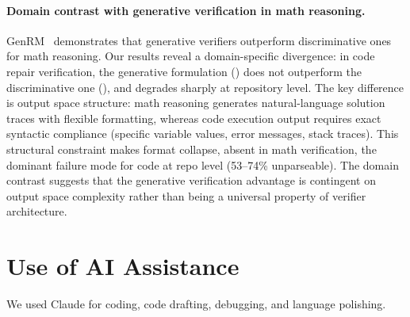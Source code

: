 \paragraph{Domain contrast with generative verification in math reasoning.}
GenRM~\cite{hosseini2025genrm} demonstrates that generative verifiers outperform discriminative ones for math reasoning. Our results reveal a domain-specific divergence: in code repair verification, the generative formulation (\cwm{}) does not outperform the discriminative one (\cls{}), and degrades sharply at repository level. The key difference is output space structure: math reasoning generates natural-language solution traces with flexible formatting, whereas code execution output requires exact syntactic compliance (specific variable values, error messages, stack traces). This structural constraint makes format collapse, absent in math verification, the dominant failure mode for code \cwm{} at repo level (53--74\% unparseable). The domain contrast suggests that the generative verification advantage is contingent on output space complexity rather than being a universal property of verifier architecture.

\section{Use of AI Assistance}
\label{app:ai-assistants}
We used Claude for coding, code drafting, debugging, and language polishing.
